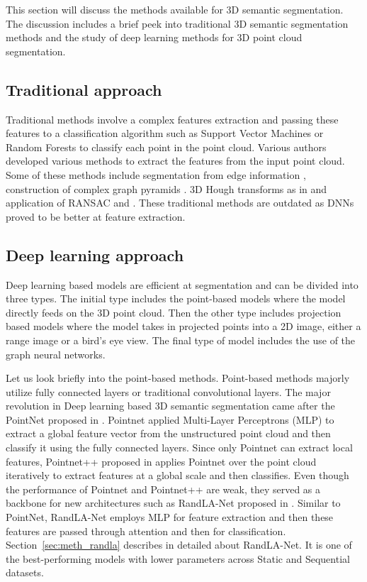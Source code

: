     This section will discuss the methods available for 3D semantic segmentation.
    The discussion includes a brief peek into traditional 3D semantic segmentation methods and the study of deep learning methods for 3D point cloud segmentation.

\subsection{Traditional approach}
Traditional methods involve a complex features extraction and passing these features to a classification algorithm such as Support Vector Machines or Random Forests to classify each point in the point cloud.
Various authors developed various methods to extract the features from the input point cloud.
Some of these methods include segmentation from edge information \cite{bhanu1986range}, construction of complex graph pyramids \cite{koster}.
3D Hough transforms as in \cite{vosselman20013d} and application of RANSAC \cite{schnabel2007efficient} and \cite{tarsha2007hough}.
These traditional methods are outdated as DNNs proved to be better at feature extraction.

\subsection{Deep learning approach}
\label{sec:dl_approach}
Deep learning based models are efficient at segmentation and can be divided into three types.
The initial type includes the point-based models where the model directly feeds on the 3D point cloud.
Then the other type includes projection based models where the model takes in projected points into a 2D image, either a range image or a bird's eye view.
The final type of model includes the use of the graph neural networks.

Let us look briefly into the point-based methods. Point-based methods majorly utilize fully connected layers or traditional convolutional layers.
The major revolution in Deep learning based 3D semantic segmentation came after the PointNet proposed in \cite{Qi_2017_CVPR_pointnet}.
Pointnet applied Multi-Layer Perceptrons (MLP) to extract a global feature vector from the unstructured point cloud and then classify it using the fully connected layers.
Since only Pointnet can extract local features, Pointnet++ proposed in \cite{qi2017pointnet++} applies Pointnet over the point cloud iteratively to extract features at a global scale and then classifies.
Even though the performance of Pointnet and Pointnet++ are weak, they served as a backbone for new architectures such as RandLA-Net proposed in \cite{Hu_2020_CVPR_Randla}.
Similar to PointNet, RandLA-Net employs MLP for feature extraction and then these features are passed through attention and then for classification.
 Section~\ref{sec:meth_randla} describes in detailed about RandLA-Net.
It is one of the best-performing models with lower parameters across Static and Sequential datasets.

